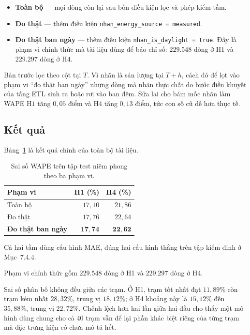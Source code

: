 \documentclass[12pt, a4paper]{report}
\begin{document}
\begin{itemize}
    \item \textbf{Toàn bộ} --- mọi dòng còn lại sau bốn điều kiện lọc và phép kiểm tầm.
    \item \textbf{Đo thật} --- thêm điều kiện \texttt{nhan\_energy\_source = measured}.
    \item \textbf{Đo thật ban ngày} --- thêm điều kiện \texttt{nhan\_is\_daylight = true}. Đây là
    phạm vi chính thức mà tài liệu dùng để báo chỉ số: $229.548$ dòng ở H$1$ và $229.297$ dòng
    ở H$4$.
\end{itemize}

Bản trước lọc theo cột tại $T$. Vì nhãn là sản lượng tại $T{+}h$, cách đó để lọt vào phạm vi
``đo thật ban ngày'' những dòng mà nhãn thực chất do bước điền khuyết của tầng ETL sinh ra hoặc
rơi vào ban đêm. Sửa lại cho bám mốc nhãn làm WAPE H$1$ tăng $0{,}05$ điểm và H$4$ tăng
$0{,}13$ điểm, tức con số cũ dễ hơn thực tế.

\FloatBarrier
\subsection{Kết quả}

Bảng~\ref{tab:ket_qua_test} là kết quả chính của toàn bộ tài liệu.

\begin{table}[htbp]
\centering
\caption{Sai số WAPE trên tập test niêm phong theo ba phạm vi.}
\label{tab:ket_qua_test}
\small
\begin{tabular}{l r r}
\toprule
\textbf{Phạm vi} & \textbf{H1 (\%)} & \textbf{H4 (\%)} \\
\midrule
Toàn bộ                   & $17{,}10$ & $21{,}86$ \\
Đo thật                   & $17{,}76$ & $22{,}64$ \\
\textbf{Đo thật ban ngày} & $\mathbf{17{,}74}$ & $\mathbf{22{,}62}$ \\
\bottomrule
\end{tabular}
\end{table}

Cả hai tầm dùng cấu hình MAE, đúng hai cấu hình thắng trên tập kiểm định ở Mục~$7.4.4$.

Phạm vi chính thức gồm $229.548$ dòng ở H1 và $229.297$ dòng ở H4.

Sai số phân bố không đều giữa các trạm. Ở H1, trạm tốt nhất đạt $11{,}89\%$ còn trạm kém nhất
$28{,}32\%$, trung vị $18{,}12\%$; ở H4 khoảng này là $15{,}12\%$ đến $35{,}88\%$, trung vị
$22{,}72\%$. Chênh lệch hơn hai lần giữa hai đầu cho thấy một mô hình dùng chung cho cả $40$
trạm vẫn để lại phần khác biệt riêng của từng trạm mà đặc trưng hiện có chưa mô tả hết.
\end{document}
